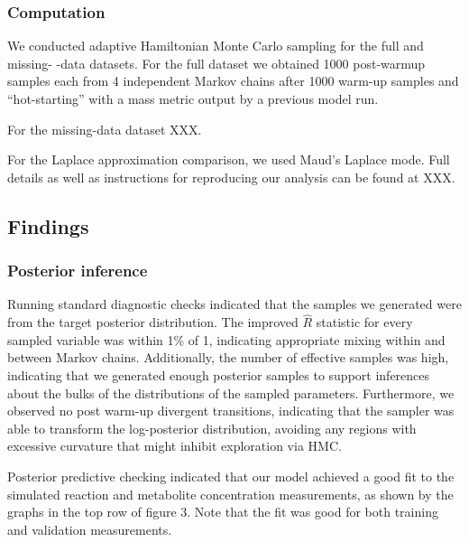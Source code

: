 \documentclass[journal=asbcd6,manuscript=article,layout=traditional]{achemso}
\begin{document}
\hypertarget{computation}{%
\subsubsection{Computation}\label{computation}}

We conducted adaptive Hamiltonian Monte Carlo sampling for the full and
missing- -data datasets. For the full dataset we obtained 1000
post-warmup samples each from 4 independent Markov chains after 1000
warm-up samples and ``hot-starting'' with a mass metric output by a
previous model run.

For the missing-data dataset XXX.

For the Laplace approximation comparison, we used Maud's Laplace mode.
Full details as well as instructions for reproducing our analysis can be
found at XXX.

\hypertarget{findings}{%
\subsection{Findings}\label{findings}}

\hypertarget{posterior-inference}{%
\subsubsection{Posterior inference}\label{posterior-inference}}

Running standard diagnostic checks indicated that the samples we
generated were from the target posterior distribution. The improved
\(\hat{R}\) statistic
\citep{vehtariRankNormalizationFoldingLocalization2021} for every
sampled variable was within 1\% of 1, indicating appropriate mixing
within and between Markov chains. Additionally, the number of effective
samples was high, indicating that we generated enough posterior samples
to support inferences about the bulks of the distributions of the
sampled parameters. Furthermore, we observed no post warm-up divergent
transitions, indicating that the sampler was able to transform the
log-posterior distribution, avoiding any regions with excessive
curvature that might inhibit exploration via HMC.

Posterior predictive checking indicated that our model achieved a good
fit to the simulated reaction and metabolite concentration measurements,
as shown by the graphs in the top row of figure 3. Note that the fit was
good for both training and validation measurements.
\end{document}
